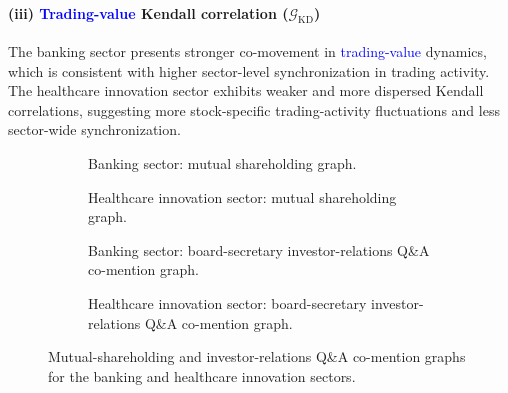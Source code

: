 \documentclass[pdflatex,sn-mathphys-num]{sn-jnl}%
\theoremstyle{thmstyleone}%
\theoremstyle{thmstyletwo}%
\theoremstyle{thmstylethree}%
\begin{document}
\paragraph{(iii) \textcolor{blue}{Trading-value} Kendall correlation ($\mathcal{G}_{\mathrm{KD}}$)}
The banking sector presents stronger co-movement in \textcolor{blue}{trading-value} dynamics, which is consistent with higher sector-level synchronization in trading activity. The healthcare innovation sector exhibits weaker and more dispersed Kendall correlations, suggesting more stock-specific trading-activity fluctuations and less sector-wide synchronization.
\begin{figure}[t]
    \centering

    \begin{subfigure}[t]{0.48\textwidth}
        \centering
        
        \caption{Banking sector: mutual shareholding graph.}
    \end{subfigure}\hfill
    \begin{subfigure}[t]{0.48\textwidth}
        \centering
        
        \caption{Healthcare innovation sector: mutual shareholding graph.}
    \end{subfigure}

    \vspace{0mm}

    \begin{subfigure}[t]{0.48\textwidth}
        \centering
        
        \caption{Banking sector: board-secretary investor-relations Q\&A co-mention graph.}
    \end{subfigure}\hfill
    \begin{subfigure}[t]{0.48\textwidth}
        \centering
        
        \caption{Healthcare innovation sector: board-secretary investor-relations Q\&A co-mention graph.}
    \end{subfigure}
    \caption{Mutual-shareholding and investor-relations Q\&A co-mention
graphs for the banking and healthcare innovation sectors.}
    \label{fig:fig3}
\end{figure}
\end{document}
